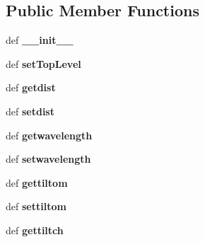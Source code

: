 \subsection*{Public Member Functions}
\begin{DoxyCompactItemize}
\item 
\hypertarget{classmyDetector_1_1myDetector_a783da80204b3f19403a26284d376fc18}{def {\bfseries \-\_\-\-\_\-init\-\_\-\-\_\-}}\label{classmyDetector_1_1myDetector_a783da80204b3f19403a26284d376fc18}

\item 
\hypertarget{classmyDetector_1_1myDetector_ad1237b8f9843336bd470eea90068c001}{def {\bfseries set\-Top\-Level}}\label{classmyDetector_1_1myDetector_ad1237b8f9843336bd470eea90068c001}

\item 
\hypertarget{classmyDetector_1_1myDetector_aa9ba5cd92fa49b0935c8cc5a88adf919}{def {\bfseries getdist}}\label{classmyDetector_1_1myDetector_aa9ba5cd92fa49b0935c8cc5a88adf919}

\item 
\hypertarget{classmyDetector_1_1myDetector_a9dbec7a26b92a1d52144dd9fd99e89a7}{def {\bfseries setdist}}\label{classmyDetector_1_1myDetector_a9dbec7a26b92a1d52144dd9fd99e89a7}

\item 
\hypertarget{classmyDetector_1_1myDetector_a73d637fe6d8f0b6685c9ea07e0444b14}{def {\bfseries getwavelength}}\label{classmyDetector_1_1myDetector_a73d637fe6d8f0b6685c9ea07e0444b14}

\item 
\hypertarget{classmyDetector_1_1myDetector_aa86114f3da1a2f6bf4d8595564654b0c}{def {\bfseries setwavelength}}\label{classmyDetector_1_1myDetector_aa86114f3da1a2f6bf4d8595564654b0c}

\item 
\hypertarget{classmyDetector_1_1myDetector_aa70f5dd1888bee1c70eaa1a1410c4cd9}{def {\bfseries gettiltom}}\label{classmyDetector_1_1myDetector_aa70f5dd1888bee1c70eaa1a1410c4cd9}

\item 
\hypertarget{classmyDetector_1_1myDetector_a2ab94c7245903209b1ec67fe726727f8}{def {\bfseries settiltom}}\label{classmyDetector_1_1myDetector_a2ab94c7245903209b1ec67fe726727f8}

\item 
\hypertarget{classmyDetector_1_1myDetector_a5814f9b4c3659e0c3ca527d2c62d0cb5}{def {\bfseries gettiltch}}\label{classmyDetector_1_1myDetector_a5814f9b4c3659e0c3ca527d2c62d0cb5}


\end{DoxyCompactItemize}
